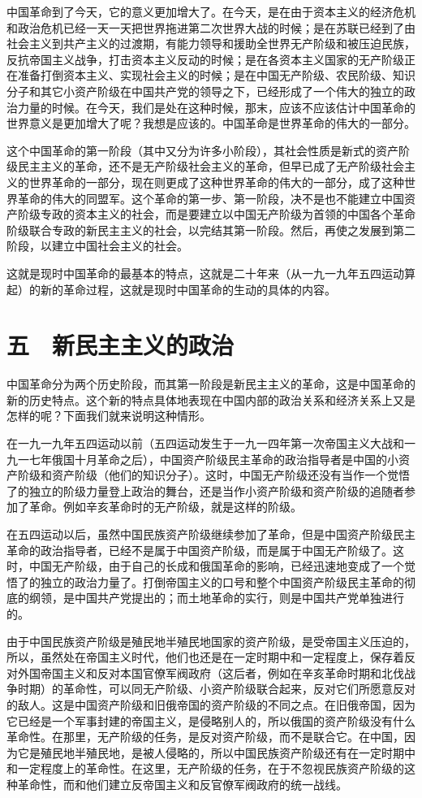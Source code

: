 中国革命到了今天，它的意义更加增大了。在今天，是在由于资本主义的经济危机和政治危机已经一天一天把世界拖进第二次世界大战的时候；是在苏联已经到了由社会主义到共产主义的过渡期，有能力领导和援助全世界无产阶级和被压迫民族，反抗帝国主义战争，打击资本主义反动的时候；是在各资本主义国家的无产阶级正在准备打倒资本主义、实现社会主义的时候；是在中国无产阶级、农民阶级、知识分子和其它小资产阶级在中国共产党的领导之下，已经形成了一个伟大的独立的政治力量的时候。在今天，我们是处在这种时候，那末，应该不应该估计中国革命的世界意义是更加增大了呢？我想是应该的。中国革命是世界革命的伟大的一部分。

这个中国革命的第一阶段（其中又分为许多小阶段），其社会性质是新式的资产阶级民主主义的革命，还不是无产阶级社会主义的革命，但早已成了无产阶级社会主义的世界革命的一部分，现在则更成了这种世界革命的伟大的一部分，成了这种世界革命的伟大的同盟军。这个革命的第一步、第一阶段，决不是也不能建立中国资产阶级专政的资本主义的社会，而是要建立以中国无产阶级为首领的中国各个革命阶级联合专政的新民主主义的社会，以完结其第一阶段。然后，再使之发展到第二阶段，以建立中国社会主义的社会。

这就是现时中国革命的最基本的特点，这就是二十年来（从一九一九年五四运动算起）的新的革命过程，这就是现时中国革命的生动的具体的内容。

\section{五　新民主主义的政治}

中国革命分为两个历史阶段，而其第一阶段是新民主主义的革命，这是中国革命的新的历史特点。这个新的特点具体地表现在中国内部的政治关系和经济关系上又是怎样的呢？下面我们就来说明这种情形。

在一九一九年五四运动以前（五四运动发生于一九一四年第一次帝国主义大战和一九一七年俄国十月革命之后），中国资产阶级民主革命的政治指导者是中国的小资产阶级和资产阶级（他们的知识分子）。这时，中国无产阶级还没有当作一个觉悟了的独立的阶级力量登上政治的舞台，还是当作小资产阶级和资产阶级的追随者参加了革命。例如辛亥革命时的无产阶级，就是这样的阶级。

在五四运动以后，虽然中国民族资产阶级继续参加了革命，但是中国资产阶级民主革命的政治指导者，已经不是属于中国资产阶级，而是属于中国无产阶级了。这时，中国无产阶级，由于自己的长成和俄国革命的影响，已经迅速地变成了一个觉悟了的独立的政治力量了。打倒帝国主义的口号和整个中国资产阶级民主革命的彻底的纲领，是中国共产党提出的；而土地革命的实行，则是中国共产党单独进行的。

由于中国民族资产阶级是殖民地半殖民地国家的资产阶级，是受帝国主义压迫的，所以，虽然处在帝国主义时代，他们也还是在一定时期中和一定程度上，保存着反对外国帝国主义和反对本国官僚军阀政府（这后者，例如在辛亥革命时期和北伐战争时期）的革命性，可以同无产阶级、小资产阶级联合起来，反对它们所愿意反对的敌人。这是中国资产阶级和旧俄帝国的资产阶级的不同之点。在旧俄帝国，因为它已经是一个军事封建的帝国主义，是侵略别人的，所以俄国的资产阶级没有什么革命性。在那里，无产阶级的任务，是反对资产阶级，而不是联合它。在中国，因为它是殖民地半殖民地，是被人侵略的，所以中国民族资产阶级还有在一定时期中和一定程度上的革命性。在这里，无产阶级的任务，在于不忽视民族资产阶级的这种革命性，而和他们建立反帝国主义和反官僚军阀政府的统一战线。


